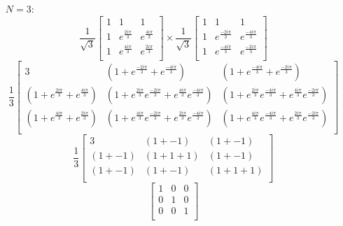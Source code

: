 \documentclass[11pt]{article}
\begin{document}
\begin{itemize}
\newpage
\item[$N = 3$:] 
	$$\frac{1}{\sqrt{3}}
	\begin{bmatrix}
	1 & 1 & 1 \\
	1 & e^{\frac{2 i \pi}{3}} & e^{\frac{4 i \pi}{3}} \\
	1 & e^{\frac{4 i \pi}{3}} & e^{\frac{2 i \pi}{3}} \\
	\end{bmatrix} \times 
	\frac{1}{\sqrt{3}}
	\begin{bmatrix}
	1 & 1 & 1 \\
	1 & e^{\frac{-2 i \pi}{3}} & e^{\frac{-4 i \pi}{3}} \\
	1 & e^{\frac{-4 i \pi}{3}} & e^{\frac{-2 i \pi}{3}} \\
	\end{bmatrix}$$
	$$\frac{1}{3} 
	\begin{bmatrix}
		3 & (1 + e^{\frac{-2 i \pi}{3}} + e^{\frac{-4 i \pi}{3}}) &  (1 + e^{\frac{-4 i \pi}{3}} + e^{\frac{-2 i \pi}{3}}) \\ 
		(1 + e^{\frac{2 i \pi}{3}} + e^{\frac{4 i \pi}{3}}) &
		(1 + e^{\frac{2 i \pi}{3}}e^{\frac{-2 i \pi}{3}} + e^{\frac{4 i \pi}{3}}e^{\frac{-4 i \pi}{3}}) & 
		(1 + e^{\frac{2 i \pi}{3}}e^{\frac{-4 i \pi}{3}} + e^{\frac{4 i \pi}{3}}e^{\frac{-2 i \pi}{3}}) \\
		(1 + e^{\frac{4 i \pi}{3}} + e^{\frac{2 i \pi}{3}}) & 
		(1 + e^{\frac{4 i \pi}{3}}e^{\frac{-2 i \pi}{3}} + e^{\frac{2 i \pi}{3}}e^{\frac{-4 i \pi}{3}}) & 
		(1 + e^{\frac{4 i \pi}{3}}e^{\frac{-4 i \pi}{3}} + e^{\frac{2 i \pi}{3}}e^{\frac{-2 i \pi}{3}}) \\
	\end{bmatrix}$$
	 $$\frac{1}{3} 
	\begin{bmatrix}
		3 & (1 + -1) &  (1 + -1) \\ 
		(1 + -1) & (1 + 1 + 1) & (1 + -1) \\
		(1 + -1) & (1 + -1) & (1 + 1 + 1) \\
	\end{bmatrix}$$
	$$
	\begin{bmatrix}
		1 & 0 & 0 \\ 
		0 & 1 & 0 \\
		0 & 0 & 1 \\
	\end{bmatrix}$$


\end{itemize}
\end{document}
